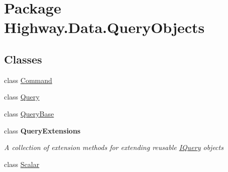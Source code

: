 \hypertarget{namespace_highway_1_1_data_1_1_query_objects}{\section{Package Highway.\-Data.\-Query\-Objects}
\label{namespace_highway_1_1_data_1_1_query_objects}
}
\subsection*{Classes}
\begin{DoxyCompactItemize}
\item 
class \hyperlink{class_highway_1_1_data_1_1_query_objects_1_1_command}{Command}
\begin{DoxyCompactList}\small\item\em \end{DoxyCompactList}\item 
class \hyperlink{class_highway_1_1_data_1_1_query_objects_1_1_query-g}{Query}
\item 
class \hyperlink{class_highway_1_1_data_1_1_query_objects_1_1_query_base}{Query\-Base}
\item 
class {\bfseries Query\-Extensions}
\begin{DoxyCompactList}\small\item\em A collection of extension methods for extending reusable \hyperlink{class_i_query-g}{I\-Query} objects \end{DoxyCompactList}\item 
class \hyperlink{class_highway_1_1_data_1_1_query_objects_1_1_scalar-g}{Scalar}
\end{DoxyCompactItemize}
